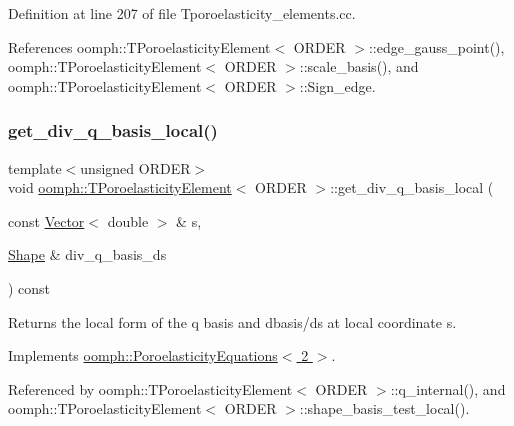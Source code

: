 Definition at line 207 of file Tporoelasticity\+\_\+elements.\+cc.



References oomph\+::\+T\+Poroelasticity\+Element$<$ O\+R\+D\+E\+R $>$\+::edge\+\_\+gauss\+\_\+point(), oomph\+::\+T\+Poroelasticity\+Element$<$ O\+R\+D\+E\+R $>$\+::scale\+\_\+basis(), and oomph\+::\+T\+Poroelasticity\+Element$<$ O\+R\+D\+E\+R $>$\+::\+Sign\+\_\+edge.

\mbox{\label{classoomph_1_1TPoroelasticityElement_a1fca2ce3e962fc273d38525d0e1f2865}} 
\subsubsection{\texorpdfstring{get\+\_\+div\+\_\+q\+\_\+basis\+\_\+local()}{get\_div\_q\_basis\_local()}\hspace{0.1cm}{\footnotesize\ttfamily [3/3]}}
{\footnotesize\ttfamily template$<$unsigned O\+R\+D\+ER$>$ \\
void \hyperlink{classoomph_1_1TPoroelasticityElement}{oomph\+::\+T\+Poroelasticity\+Element}$<$ O\+R\+D\+ER $>$\+::get\+\_\+div\+\_\+q\+\_\+basis\+\_\+local (\begin{DoxyParamCaption}\item[{const \hyperlink{classoomph_1_1Vector}{Vector}$<$ double $>$ \&}]{s,  }\item[{\hyperlink{classoomph_1_1Shape}{Shape} \&}]{div\+\_\+q\+\_\+basis\+\_\+ds }\end{DoxyParamCaption}) const\hspace{0.3cm}{\ttfamily [virtual]}}



Returns the local form of the q basis and dbasis/ds at local coordinate s. 



Implements \hyperlink{classoomph_1_1PoroelasticityEquations_ae137222ce1c7904212ce34ad180123f8}{oomph\+::\+Poroelasticity\+Equations$<$ 2 $>$}.



Referenced by oomph\+::\+T\+Poroelasticity\+Element$<$ O\+R\+D\+E\+R $>$\+::q\+\_\+internal(), and oomph\+::\+T\+Poroelasticity\+Element$<$ O\+R\+D\+E\+R $>$\+::shape\+\_\+basis\+\_\+test\+\_\+local().

